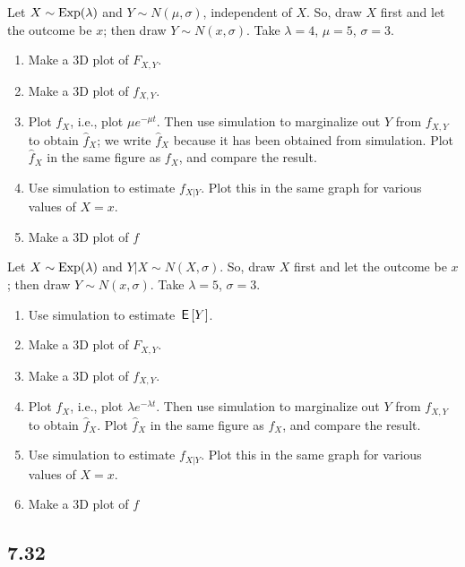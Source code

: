 \documentclass[assignments]{subfiles}
\begin{document}
\begin{exercise}
Let $X\sim\mathrm{Exp}(\lambda)$ and $Y \sim N(\mu, \sigma)$, independent of $X$.
So, draw $X$ first and let the outcome be $x$; then draw $Y\sim N(x, \sigma)$.
Take $\lambda=4$, $\mu = 5$, $\sigma=3$.
\begin{enumerate}
\item Make a 3D plot of $F_{X,Y}$.
\item Make a 3D plot of $f_{X,Y}$.
\item Plot $f_{X}$, i.e., plot $\mu e^{-\mu t}$.
  Then use simulation to marginalize out $Y$ from $f_{X,Y}$ to obtain $\hat f_X$; we write $\hat f_X$ because it has been obtained from simulation.
  Plot $\hat f_X$ in the same figure as $f_X$, and compare the result.
\item Use simulation to estimate $f_{X|Y}$. Plot this in the same graph for various values of $X=x$. 
\item Make a 3D plot of $f$
\end{enumerate}
\end{exercise}

\begin{exercise}
Let $X\sim\mathrm{Exp}(\lambda)$ and $Y| X \sim N(X, \sigma)$. So,  draw $X$ first and let the outcome be $x$;  then draw $Y\sim N(x, \sigma)$. Take $\lambda = 5$, $\sigma=3$. 
\begin{enumerate}
\item Use simulation to estimate $\,\mathsf{E}\left[Y\right]$. 
\item Make a 3D plot of $F_{X,Y}$.
\item Make a 3D plot of $f_{X,Y}$.
\item Plot $f_{X}$, i.e., plot $\lambda e^{-\lambda t}$.
  Then use simulation to marginalize out $Y$ from $f_{X,Y}$ to obtain $\hat f_X$.
  Plot $\hat f_X$ in the same figure as $f_X$, and compare the result.
\item Use simulation to estimate $f_{X|Y}$. Plot this in the same graph for various values of $X=x$. 
\item Make a 3D plot of $f$
\end{enumerate}
\end{exercise}





\subsection{7.32}
\label{sec:orga22aa79}
\end{document}
